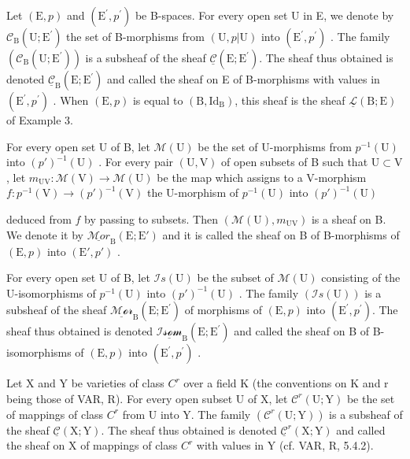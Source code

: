 
Let \((\mathrm{E},p)\) and \((\mathrm{E}^{\prime},p^{\prime})\) be B-spaces. For every open set U in E, we denote by \(\mathcal{C}_{\mathrm{B}}(\mathrm{U};\mathrm{E}^{\prime})\) the set of B-morphisms from \((\mathrm{U},p|\mathrm{U})\) into \((\mathrm{E}^{\prime},p^{\prime})\) . The family \((\mathcal{C}_{\mathrm{B}}(\mathrm{U};\mathrm{E}^{\prime}))\) is a subsheaf of the sheaf \(\underline{\mathcal{C}}(\mathrm{E};\mathrm{E}^{\prime})\). The sheaf thus obtained is denoted \(\underline{\mathcal{C}}_{\mathrm{B}}(\mathrm{E};\mathrm{E}^{\prime})\) and called the sheaf on E of B-morphisms with values in \((\mathrm{E}^{\prime},p^{\prime})\) . When \((\mathrm{E},p)\) is equal to \((\mathrm{B},\mathrm{Id}_{\mathrm{B}})\), this sheaf is the sheaf \(\underline{\mathcal{L}}(\mathrm{B};\mathrm{E})\) of Example 3.

For every open set U of B, let \(\mathcal{M}(\mathrm{U})\) be the set of U-morphisms from \(p^{-1}(\mathrm{U})\) into \((p')^{-1}(\mathrm{U})\) . For every pair \((\mathrm{U},\mathrm{V})\) of open subsets of B such that \(\mathrm{U}\subset \mathrm{V}\) , let \(m_{\mathrm{UV}}\colon \mathcal{M}(\mathrm{V})\to \mathcal{M}(\mathrm{U})\) be the map which assigns to a V-morphism \(f\colon p^{-1}(\mathrm{V})\to (p')^{-1}(\mathrm{V})\) the U-morphism of \(p^{-1}(\mathrm{U})\) into \((p')^{-1}(\mathrm{U})\)

deduced from \(f\) by passing to subsets. Then \((\mathcal{M}(\mathrm{U}), m_{\mathrm{UV}})\) is a sheaf on B. We denote it by \(\underline{\mathcal{M}or}_{\mathrm{B}}(\mathrm{E}; \mathrm{E}')\) and it is called the sheaf on B of B-morphisms of \((\mathrm{E}, p)\) into \((\mathrm{E}', p')\) .

For every open set U of B, let \(\mathcal{I}s(\mathrm{U})\) be the subset of \(\mathcal{M}(\mathrm{U})\) consisting of the U-isomorphisms of \(p^{-1}(\mathrm{U})\) into \((p')^{-1}(\mathrm{U})\) . The family \((\mathcal{I}s(\mathrm{U}))\) is a subsheaf of the sheaf \(\underline{\mathcal{Mor}}_{\mathrm{B}}(\mathrm{E};\mathrm{E}^{\prime})\) of morphisms of \((\mathrm{E},p)\) into \((\mathrm{E}^{\prime},p^{\prime})\). The sheaf thus obtained is denoted \(\underline{\mathcal{Isom}}_{\mathrm{B}}(\mathrm{E};\mathrm{E}^{\prime})\) and called the sheaf on B of B-isomorphisms of \((\mathrm{E},p)\) into \((\mathrm{E}^{\prime},p^{\prime})\) .


Let X and Y be varieties of class \(C^{r}\) over a field K (the conventions on K and r being those of VAR, R). For every open subset U of X, let \(\mathcal{C}^{r}(\mathrm{U};\mathrm{Y})\) be the set of mappings of class \(C^{r}\) from U into Y. The family \((\mathcal{C}^{r}(\mathrm{U};\mathrm{Y}))\) is a subsheaf of the sheaf \(\underline{\mathcal{C}}(\mathrm{X};\mathrm{Y})\). The sheaf thus obtained is denoted \(\underline{\mathcal{C}}^{r}(\mathrm{X};\mathrm{Y})\) and called the sheaf on X of mappings of class \(C^{r}\) with values in Y (cf. VAR, R, 5.4.2).

